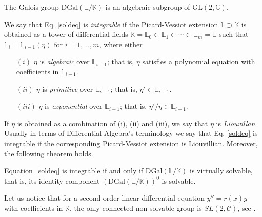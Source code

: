 \documentclass[final]{siamart0516}
\begin{document}
    \begin{theorem}  The Galois group $\mathrm{DGal}(\mathbb{L}/\mathbb{K})$ is an
         algebraic subgroup of $\mathrm{GL}(2,\mathbb{C})$.
    \end{theorem}
    
We say that Eq. \eqref{soldeq} is \emph{integrable} if the Picard-Vessiot extension
    $\mathbb{L}\supset \mathbb{K}$ is obtained as a tower of differential fields
    $\mathbb{K}=\mathbb{L}_0\subset \mathbb{L}_1\subset\cdots\subset \mathbb{L}_m=\mathbb{L}$ such that
    $\mathbb{L}_i=\mathbb{L}_{i-1}(\eta)$ for $i=1,\ldots,m$, where either
    \begin{itemize}
         \item[$(i)$] $\eta$ is {\emph{algebraic}} over $\mathbb{L}_{i-1}$; that is, $\eta$ satisfies a
         polynomial equation with coefficients in $\mathbb{L}_{i-1}$.
         \item[$(ii)$] $\eta$ is {\emph{primitive}} over $\mathbb{L}_{i-1}$; that is, $\eta' \in \mathbb{L}_{i-1}$.
         \item[$(iii)$] $\eta$ is {\emph{exponential}} over $\mathbb{L}_{i-1}$; that is, $\eta' /\eta \in \mathbb{L}_{i-1}$.
    \end{itemize}

If $\eta$     is obtained as a  combination of (i), (ii) and (iii), we say that $\eta$ is \emph{ Liouvillan}.
    Usually in terms of  Differential Algebra's terminology we say that
    Eq. \eqref{soldeq} is integrable if the corresponding
    Picard-Vessiot extension is Liouvillian. Moreover, the
    following theorem  holds.
    
    \begin{theorem}[Kolchin]
         \label{LK}
         Equation~\eqref{soldeq} is integrable if
         and only if $\mathrm{DGal}(\mathbb{L}/\mathbb{K})$ is virtually solvable, that is, its identity component
         $(\mathrm{DGal}(\mathbb{L}/\mathbb{K}))^0$ is solvable.
    \end{theorem}


Let us notice that for a second-order linear differential
equation  $y'' =r(x)y$
with coefficients in $\mathbb{K}$, 
the only connected non-solvable group is $SL(2,\mathcal{C})$, see \cite{ka,morales,vasi} .
\end{document}

